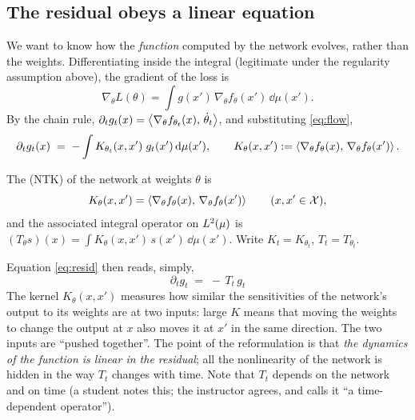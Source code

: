 \subsection{The residual obeys a linear equation}\label{sec:L2-resid}
We want to know how the \emph{function} computed by the network evolves, rather than the weights. Differentiating inside the integral (legitimate under the regularity assumption above), the gradient of the loss is
\[
  \nabla_\theta L(\theta)=\int g(x')\,\nabla_\theta f_\theta(x')\,\dd\mu(x').
\]
By the chain rule, $\partial_t g_t(x)=\left\langle \nabla_\theta f_{\theta_t}(x),\,\dot\theta_t\right\rangle$, and substituting \eqref{eq:flow},
\begin{equation}\label{eq:resid}
  \partial_t g_t(x)\;=\;-\int K_{\theta_t}(x,x')\;g_t(x')\,\mathrm{d}\mu(x'),\qquad K_\theta(x,x'):=\left\langle \nabla_\theta f_\theta(x),\,\nabla_\theta f_\theta(x')\right\rangle.
\end{equation}

\begin{defn}\label{def:ntk}
The  (NTK) of the network at weights $\theta$ is
\[
   K_\theta(x,x')=\left\langle \nabla_\theta f_\theta(x),\,\nabla_\theta f_\theta(x')\right\rangle\qquad(x,x'\in\mathcal X),
\]
and the associated integral operator on $L^2(\mu)$ is $(T_\theta s)(x)=\int K_\theta(x,x')\,s(x')\,\dd\mu(x')$. Write $K_t=K_{\theta_t}$, $T_t=T_{\theta_t}$.
\end{defn}

Equation \eqref{eq:resid} then reads, simply,
\begin{equation}\label{eq:linear}
  \boxed{\;\partial_t g_t\;=\;-\,T_t\,g_t\;}
\end{equation}
The kernel $K_\theta(x,x')$ measures how similar the sensitivities of the network's output to its weights are at two inputs: large $K$ means that moving the weights to change the output at $x$ also moves it at $x'$ in the same direction. The two inputs are ``pushed together''.
The point of the reformulation is that \emph{the dynamics of the function is linear in the residual}; all the nonlinearity of the network is hidden in the way $T_t$ changes with time. Note that $T_t$ depends on the network and on time (a student notes this; the instructor agrees, and calls it ``a time-dependent operator'').

